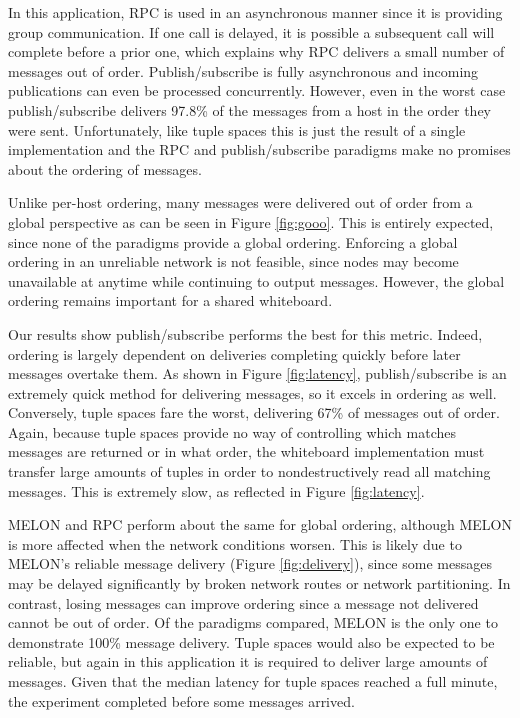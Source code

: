 \documentclass{llncs}
\begin{document}
In this application, RPC is used in an asynchronous manner since it is providing group communication. If one call is delayed, it is possible a subsequent call will complete before a prior one, which explains why RPC delivers a small number of messages out of order. Publish/subscribe is fully asynchronous and incoming publications can even be processed concurrently. However, even in the worst case publish/subscribe delivers 97.8\% of the messages from a host in the order they were sent. Unfortunately, like tuple spaces this is just the result of a single implementation and the RPC and publish/subscribe paradigms make no promises about the ordering of messages. 

Unlike per-host ordering, many messages were delivered out of order from a global perspective as can be seen in Figure \ref{fig:gooo}. This is entirely expected, since none of the paradigms provide a global ordering. Enforcing a global ordering in an unreliable network is not feasible, since nodes may become unavailable at anytime while continuing to output messages. However, the global ordering remains important for a shared whiteboard.

Our results show publish/subscribe performs the best for this metric. Indeed, ordering is largely dependent on deliveries completing quickly before later messages overtake them. As shown in Figure \ref{fig:latency}, publish/subscribe is an extremely quick method for delivering messages, so it excels in ordering as well. Conversely, tuple spaces fare the worst, delivering 67\% of messages out of order. Again, because tuple spaces provide no way of controlling which matches messages are returned or in what order, the whiteboard implementation must transfer large amounts of tuples in order to nondestructively read all matching messages. This is extremely slow, as reflected in Figure \ref{fig:latency}.

MELON and RPC perform about the same for global ordering, although MELON is more affected when the network conditions worsen. This is likely due to MELON's reliable message delivery (Figure \ref{fig:delivery}), since some messages may be delayed significantly by broken network routes or network partitioning. In contrast, losing messages can improve ordering since a message not delivered cannot be out of order. Of the paradigms compared, MELON is the only one to demonstrate 100\% message delivery. Tuple spaces would also be expected to be reliable, but again in this application it is required to deliver large amounts of messages. Given that the median latency for tuple spaces reached a full minute, the experiment completed before some messages arrived.
\end{document}
